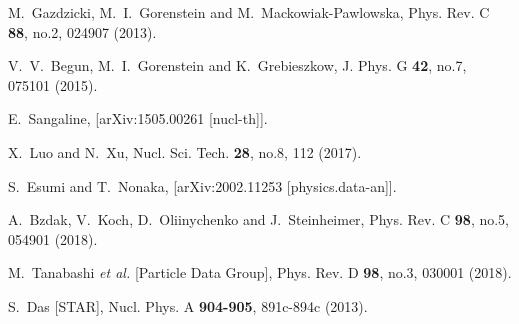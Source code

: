 \begin{thebibliography}{99}
M.~Gazdzicki, M.~I.~Gorenstein and M.~Mackowiak-Pawlowska,
Phys. Rev. C \textbf{88}, no.2, 024907 (2013).


V.~V.~Begun, M.~I.~Gorenstein and K.~Grebieszkow,
J. Phys. G \textbf{42}, no.7, 075101 (2015).

E.~Sangaline,
[arXiv:1505.00261 [nucl-th]].

X.~Luo and N.~Xu,
Nucl. Sci. Tech. \textbf{28}, no.8, 112 (2017).

S.~Esumi and T.~Nonaka,
[arXiv:2002.11253 [physics.data-an]].


A.~Bzdak, V.~Koch, D.~Oliinychenko and J.~Steinheimer,
Phys. Rev. C \textbf{98}, no.5, 054901 (2018).


M.~Tanabashi \textit{et al.} [Particle Data Group],
Phys. Rev. D \textbf{98}, no.3, 030001 (2018).


S.~Das [STAR],
Nucl. Phys. A \textbf{904-905}, 891c-894c (2013).


\end{thebibliography}
